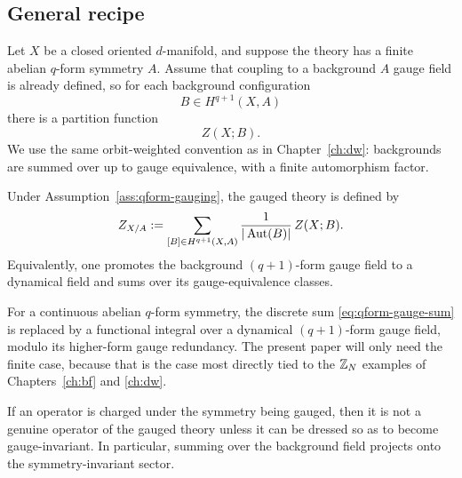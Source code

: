 \subsection{General recipe}

\begin{assumption}\label{ass:qform-gauging}
Let $X$ be a closed oriented $d$-manifold, and suppose the theory has a finite abelian $q$-form symmetry $A$. Assume that coupling to a background $A$ gauge field is already defined, so for each background configuration
\begin{equation*}
B\in H^{q+1}(X,A)
\end{equation*}
there is a partition function
\begin{equation*}
Z(X;B).
\end{equation*}
We use the same orbit-weighted convention as in Chapter~\ref{ch:dw}: backgrounds are summed over up to gauge equivalence, with a finite automorphism factor.
\end{assumption}

\begin{definition}\label{def:gauging-qform}
Under Assumption~\ref{ass:qform-gauging}, the gauged theory is defined by
\begin{equation}\label{eq:qform-gauge-sum}
Z_{X/A}
:=
\sum_{[B]\in H^{q+1}(X,A)}
\frac{1}{|\operatorname{Aut}(B)|}\,
Z(X;B).
\end{equation}
Equivalently, one promotes the background $(q+1)$-form gauge field to a dynamical field and sums over its gauge-equivalence classes.
\end{definition}

\begin{remark}\label{rem:qform-continuous-gauging}
For a continuous abelian $q$-form symmetry, the discrete sum \eqref{eq:qform-gauge-sum} is replaced by a functional integral over a dynamical $(q+1)$-form gauge field, modulo its higher-form gauge redundancy. The present paper will only need the finite case, because that is the case most directly tied to the $\mathbb{Z}_N$ examples of Chapters~\ref{ch:bf} and \ref{ch:dw}.
\end{remark}

\begin{proposition}\label{prop:gauging-selection}
If an operator is charged under the symmetry being gauged, then it is not a genuine operator of the gauged theory unless it can be dressed so as to become gauge-invariant. In particular, summing over the background field projects onto the symmetry-invariant sector.
\end{proposition}

